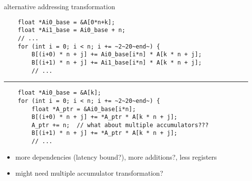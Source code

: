 \begin{frame}[fragile,label=addrXform2BackfireAlt]{alternative addressing transformation}
    \vspace{-.25cm}
\begin{lstlisting}
    float *Ai0_base = &A[0*n+k];
    float *Ai1_base = Ai0_base + n;
    // ...
    for (int i = 0; i < n; i += ~2~20~end~) {
        B[(i+0) * n + j] += Ai0_base[i*n] * A[k * n + j];
        B[(i+1) * n + j] += Ai1_base[i*n] * A[k * n + j];
        // ...
\end{lstlisting}
\hrule
\begin{lstlisting}
    float *Ai0_base = &A[k];
    for (int i = 0; i < n; i += ~2~20~end~) {
        float *A_ptr = &Ai0_base[i*n];
        B[(i+0) * n + j] += *A_ptr * A[k * n + j];
        A_ptr += n;  // what about multiple accumulators???
        B[(i+1) * n + j] += *A_ptr * A[k * n + j];
        // ...
\end{lstlisting}
    \begin{itemize}
    \item more dependencies (latency bound?), more additions?, less registers
    \item might need multiple accumulator transformation?
    \end{itemize}
\end{frame}

